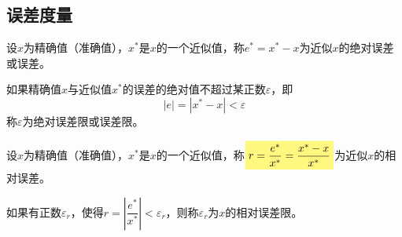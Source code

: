 \subsection{误差度量}
\begin{definition}[误差]
    设$x$为精确值（准确值），$x^*$是$x$的一个近似值，称$e^* = x^*-x$为近似$x$的绝对误差或误差。
\end{definition}
\begin{definition}[误差限]
    如果精确值$x$与近似值$x^*$的误差的绝对值不超过某正数$\varepsilon$，即
    \[
        |e| = |x^*-x|<\varepsilon
    \]
    称$\varepsilon$为绝对误差限或误差限。
\end{definition}
\begin{definition}[相对误差]
    设$x$为精确值（准确值），$x^*$是$x$的一个近似值，称$\colorbox{yellow!50}{$r = \dfrac{e^*}{x^*}=\dfrac{x^*-x}{x^*}$}$为近似$x$的相对误差。
\end{definition}
\begin{definition}[相对误差限]
    如果有正数$\varepsilon_r$，使得$r = \left| \dfrac{e^*}{x^*} \right|<\varepsilon_r$，则称$\varepsilon_r$为$x$的相对误差限。
\end{definition}

